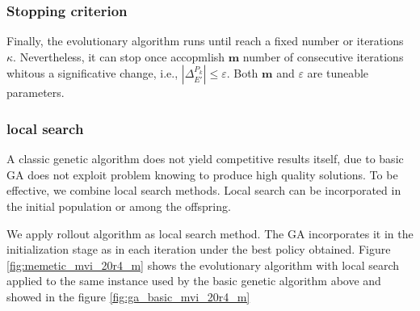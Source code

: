 \subsubsection*{Stopping criterion}

Finally, the evolutionary algorithm runs until reach a fixed number or iterations $\kappa$. Nevertheless, it can stop once accopmlish $\mathbf{m}$ number of consecutive iterations whitous a significative change, i.e., $|\Delta^{P_k}_{E'}|\leq \varepsilon$. Both $\mathbf{m}$ and $\varepsilon$ are tuneable parameters.





\subsubsection*{local search}


A classic genetic algorithm does not yield competitive results itself, due to basic GA does not exploit problem knowing to produce high quality solutions. To be effective, we combine local search methods. Local search can be incorporated in the initial population or among the offspring.

We apply rollout algorithm as local search method. The GA incorporates it in the initialization stage as in each iteration under the best policy obtained. Figure \ref{fig:memetic_mvi_20r4_m} shows the evolutionary algorithm with local search applied to the same instance used by the basic genetic algorithm above and showed in the figure \ref{fig:ga_basic_mvi_20r4_m}



